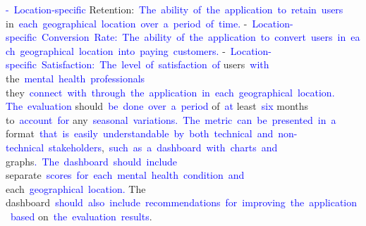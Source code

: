 \documentclass{article}
\begin{document}
\begin{tcolorbox}[colframe=black,colback=white]
{}\textcolor{blue}{-}\textcolor{blue}{~Location}\textcolor{blue}{-specific} Retention:\textcolor{blue}{~The}\textcolor{blue}{~ability}\textcolor{blue}{~of}\textcolor{blue}{~the}\textcolor{blue}{~application}\textcolor{blue}{~to}\textcolor{blue}{~retain}\textcolor{blue}{~users} in\textcolor{blue}{~each}\textcolor{blue}{~geographical}\textcolor{blue}{~location}\textcolor{blue}{~over}\textcolor{blue}{~a}\textcolor{blue}{~period}\textcolor{blue}{~of}\textcolor{blue}{~time}\textcolor{blue}{.
}-\textcolor{blue}{~Location}\textcolor{blue}{-specific}\textcolor{blue}{~Conversion}\textcolor{blue}{~Rate}\textcolor{blue}{:}\textcolor{blue}{~The}\textcolor{blue}{~ability}\textcolor{blue}{~of}\textcolor{blue}{~the}\textcolor{blue}{~application}\textcolor{blue}{~to}\textcolor{blue}{~convert}\textcolor{blue}{~users}\textcolor{blue}{~in}\textcolor{blue}{~each}\textcolor{blue}{~geographical}\textcolor{blue}{~location}\textcolor{blue}{~into}\textcolor{blue}{~paying}\textcolor{blue}{~customers}\textcolor{blue}{.
}-\textcolor{blue}{~Location}\textcolor{blue}{-specific}\textcolor{blue}{~Satisfaction}\textcolor{blue}{:}\textcolor{blue}{~The}\textcolor{blue}{~level}\textcolor{blue}{~of}\textcolor{blue}{~satisfaction}\textcolor{blue}{~of} users\textcolor{blue}{~with} the\textcolor{blue}{~mental}\textcolor{blue}{~health}\textcolor{blue}{~professionals} they\textcolor{blue}{~connect}\textcolor{blue}{~with}\textcolor{blue}{~through}\textcolor{blue}{~the}\textcolor{blue}{~application}\textcolor{blue}{~in}\textcolor{blue}{~each}\textcolor{blue}{~geographical}\textcolor{blue}{~location}\textcolor{blue}{.
}\textcolor{blue}{The}\textcolor{blue}{~evaluation} should\textcolor{blue}{~be}\textcolor{blue}{~done}\textcolor{blue}{~over}\textcolor{blue}{~a}\textcolor{blue}{~period} of\textcolor{blue}{~at} least\textcolor{blue}{~six} months to\textcolor{blue}{~account}\textcolor{blue}{~for} any\textcolor{blue}{~seasonal}\textcolor{blue}{~variations}\textcolor{blue}{.}\textcolor{blue}{~The}\textcolor{blue}{~metric}\textcolor{blue}{~can}\textcolor{blue}{~be}\textcolor{blue}{~presented}\textcolor{blue}{~in}\textcolor{blue}{~a} format\textcolor{blue}{~that}\textcolor{blue}{~is}\textcolor{blue}{~easily}\textcolor{blue}{~understandable}\textcolor{blue}{~by}\textcolor{blue}{~both}\textcolor{blue}{~technical}\textcolor{blue}{~and}\textcolor{blue}{~non}\textcolor{blue}{-}\textcolor{blue}{technical}\textcolor{blue}{~stakeholders},\textcolor{blue}{~such}\textcolor{blue}{~as}\textcolor{blue}{~a}\textcolor{blue}{~dashboard}\textcolor{blue}{~with}\textcolor{blue}{~charts}\textcolor{blue}{~and} graphs\textcolor{blue}{.}\textcolor{blue}{~The}\textcolor{blue}{~dashboard}\textcolor{blue}{~should}\textcolor{blue}{~include} separate\textcolor{blue}{~scores}\textcolor{blue}{~for}\textcolor{blue}{~each}\textcolor{blue}{~mental}\textcolor{blue}{~health}\textcolor{blue}{~condition}\textcolor{blue}{~and} each\textcolor{blue}{~geographical}\textcolor{blue}{~location}\textcolor{blue}{.} The dashboard\textcolor{blue}{~should}\textcolor{blue}{~also}\textcolor{blue}{~include}\textcolor{blue}{~recommendations}\textcolor{blue}{~for}\textcolor{blue}{~improving}\textcolor{blue}{~the}\textcolor{blue}{~application}\textcolor{blue}{~based} on\textcolor{blue}{~the}\textcolor{blue}{~evaluation}\textcolor{blue}{~results}.\textcolor{blue}{}
\end{tcolorbox}
\end{document}
